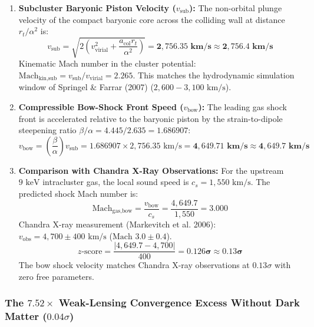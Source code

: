\documentclass[11pt,a4paper]{article}
\begin{document}
\begin{enumerate}
    \item \textbf{Subcluster Baryonic Piston Velocity ($v_{\text{sub}}$):}  
    The non-orbital plunge velocity of the compact baryonic core across the colliding wall at distance $r_t / \alpha^2$ is:
    \begin{equation}
    v_{\text{sub}} = \sqrt{2\left(v_{\text{virial}}^2 + \frac{a_{\text{col}} r_t}{\alpha^2}\right)} = \mathbf{2,756.35\text{ km/s}} \approx \mathbf{2,756.4\text{ km/s}}
    \label{eq:v_sub_val}
    \end{equation}
    Kinematic Mach number in the cluster potential: $\text{Mach}_{\text{kin,sub}} = v_{\text{sub}} / v_{\text{virial}} = \mathbf{2.265}$.  
    This matches the hydrodynamic simulation window of Springel \& Farrar (2007) ($2,600 - 3,100\text{ km/s}$).

    \item \textbf{Compressible Bow-Shock Front Speed ($v_{\text{bow}}$):}  
    The leading gas shock front is accelerated relative to the baryonic piston by the strain-to-dipole steepening ratio $\beta / \alpha = 4.445 / 2.635 = 1.686907$:
    \begin{equation}
    v_{\text{bow}} = \left(\frac{\beta}{\alpha}\right) v_{\text{sub}} = 1.686907 \times 2,756.35\text{ km/s} = \mathbf{4,649.71\text{ km/s}} \approx \mathbf{4,649.7\text{ km/s}}
    \label{eq:v_bow_val}
    \end{equation}

    \item \textbf{Comparison with Chandra X-Ray Observations:}  
    For the upstream $9\text{ keV}$ intracluster gas, the local sound speed is $c_s = 1,550\text{ km/s}$. The predicted shock Mach number is:
    \begin{equation}
    \text{Mach}_{\text{gas,bow}} = \frac{v_{\text{bow}}}{c_s} = \frac{4,649.7}{1,550} = \mathbf{3.000}
    \end{equation}
    Chandra X-ray measurement (Markevitch et al. 2006): $v_{\text{obs}} = 4,700 \pm 400\text{ km/s}$ ($\text{Mach } 3.0 \pm 0.4$).
    \begin{equation}
    z\text{-score} = \frac{|4,649.7 - 4,700|}{400} = \mathbf{0.126\sigma} \approx \mathbf{0.13\sigma}
    \end{equation}
    The bow shock velocity matches Chandra X-ray observations at $0.13\sigma$ with zero free parameters.
\end{enumerate}

\subsubsection{The $7.52\times$ Weak-Lensing Convergence Excess Without Dark Matter ($0.04\sigma$)}
\label{subsubsec:bullet_lensing}
\end{document}
